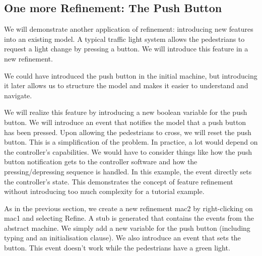 {\begin{description}
\begin{description}
\begin{description}
			\end{description}
		\Witnesses
			\begin{description}
			\end{description}
		\ThenAct
			\begin{description}
			\nItemX{ act1 }{ cars\_colours :=  new\_value\_colours }
			\end{description}
		\EndAct
		\end{description}
\END
\end{description}
}

\subsection{One more Refinement: The Push Button}
\label{tut_one_more_refinement}

We will demonstrate another application of refinement: introducing new features into an existing model.  A typical traffic light system allows the pedestrians to request a light change by pressing a button.  We will introduce this feature in a new refinement.

We could have introduced the push button in the initial machine, but introducing it later allows us to structure the model and makes it easier to understand and navigate.

We will realize this feature by introducing a new boolean variable for the push button.  We will introduce an event that notifies the model that a push button has been pressed.  Upon allowing the pedestrians to cross, we will reset the push button.  This is a simplification of the problem.  In practice, a lot would depend on the controller's capabilities.  We would have to consider things like how the push button notification gets to the controller software and how the pressing/depressing sequence is handled. In this example, the event directly sets the controller's state.  This demonstrates the concept of feature refinement without introducing too much complexity for a tutorial example.

As in the previous section, we create a new refinement \textsf{mac2} by right-clicking on \textsf{mac1} and selecting \textsf{Refine}.  A stub is generated that contains the events from the abstract machine.  We simply add a new variable for the push button (including typing and an initialisation clause).  We also introduce an event that sets the button.  This event doesn't work while the pedestrians have a green light.

